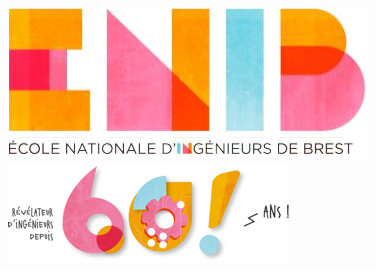 \documentclass[a4paper, twoside]{article}
\begin{document}
\setcounter{secnumdepth}{4}
\renewcommand{\thesection}{\underline{\arabic{section}:}}
\renewcommand{\thesubsection}{\Roman{subsection}.}
\renewcommand{\thesubsubsection}{\arabic{subsubsection}.}
\renewcommand{\theparagraph}{\alph{paragraph}.}

\begin{figure}[t]
    \begin{minipage}[b]{0.2\linewidth}
        \raggedright \includegraphics[scale=0.5]{enib.jpg}
    \end{minipage}\hfill
    \begin{minipage}[b]{0.4\linewidth}    
        \raggedleft \includegraphics[scale=0.5]{logo.jpg}
    \end{minipage}
\end{figure}
\end{document}
